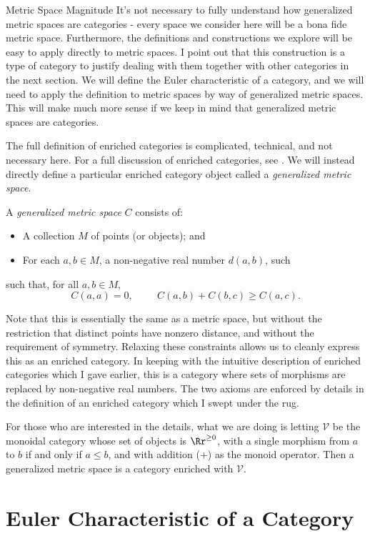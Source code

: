 \documentclass[12pt]{pom_thesis}
\begin{document}
\begin{chapter}{Metric Space Magnitude}
It's not necessary to fully understand how generalized metric spaces are categories - every space we consider here will be a bona fide metric space. Furthermore, the definitions and constructions we explore will be easy to apply directly to metric spaces. I point out that this construction is a type of category to justify dealing with them together with other categories in the next section. We will define the Euler characteristic of a category, and we will need to apply the definition to metric spaces by way of generalized metric spaces. This will make much more sense if we keep in mind that generalized metric spaces are categories.

The full definition of enriched categories is complicated, technical, and not necessary here. For a full discussion of enriched categories, see \cite{Kelly1}. We will instead directly define a particular enriched category object called a \emph{generalized metric space}.
\begin{defn}
A \emph{generalized metric space} $C$ consists of:
\begin{itemize}
\item A collection $M$ of points (or objects); and
\item For each $a,b \in M$, a non-negative real number $d(a,b)$, such
\end{itemize}
such that, for all $a,b \in M$,
\[C(a,a) = 0,\hspace{1cm} C(a,b) + C(b,c) \geq C(a,c).
\]
\end{defn}
Note that this is essentially the same as a metric space, but without the restriction that distinct points have nonzero distance, and without the requirement of symmetry. Relaxing these constraints allows us to cleanly express this as an enriched category. In keeping with the intuitive description of enriched categories which I gave earlier, this is a category where sets of morphisms are replaced by non-negative real numbers. The two axioms are enforced by details in the definition of an enriched category which I swept under the rug.

For those who are interested in the details, what we are doing is letting $\mathcal{V}$ be the monoidal category whose set of objects is $\Rr^{\geq 0}$, with a single morphism from $a$ to $b$ if and only if $a \leq b$, and with addition (+) as the monoid operator. Then a generalized metric space is a category enriched with $\mathcal{V}$. 


\section{Euler Characteristic of a Category}

\end{chapter}
\end{document}
